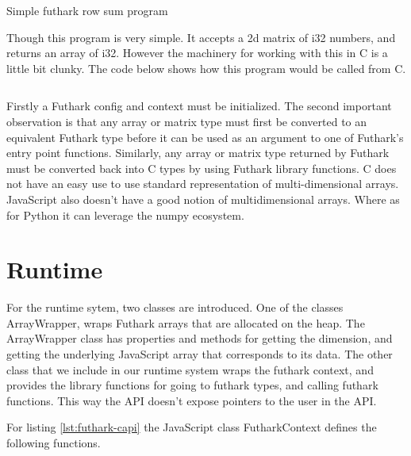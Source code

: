 \documentclass[11pt]{book}
\begin{document}
\begin{listing}[H] 
        \inputminted[fontsize=\small,baselinestretch=0.5,linenos]{haskell}{code/compiler/c-backend/main.fut}
        \caption{Simple futhark row sum program}
        \label{lst:futhark-capi}   

\end{listing} 

Though this program is very simple. It accepts a 2d matrix of i32 numbers, and returns an array of i32. However the machinery for working with this in C is a little bit clunky. The code below shows how this program would be called from C.

\begin{listing}[H] 
        \inputminted[fontsize=\small,baselinestretch=0.5,linenos]{C}{code/compiler/c-backend/example.c}
        \label{lst:capi}    
\end{listing} 

Firstly a Futhark config and context must be initialized. The second important observation is that any array or matrix type must first be converted to an equivalent Futhark type before it can be used as an argument to one of Futhark's entry point functions. Similarly, any array or matrix type returned by Futhark must be converted back into C types by using Futhark library functions. C does not have an easy use to use standard representation of multi-dimensional arrays. JavaScript also doesn't have a good notion of multidimensional arrays. Where as for Python it can leverage the numpy ecosystem. 

\section{Runtime}
For the runtime sytem, two classes are introduced. One of the classes ArrayWrapper, wraps Futhark arrays that are allocated on the heap. The ArrayWrapper class has properties and methods for getting the dimension, and getting the underlying JavaScript array that corresponds to its data. The other class that we include in our runtime system wraps the futhark context, and provides the library functions for going to futhark types, and calling futhark functions. This way the API doesn't expose pointers to the user in the API. 

For listing \ref{lst:futhark-capi} the JavaScript class FutharkContext defines the following functions.
\end{document}
